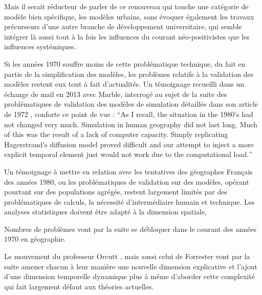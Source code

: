 Mais il serait réducteur de parler de ce renouveau qui touche une catégorie de modèle bien spécifique, les modèles urbains, sans évoquer également les travaux précurseurs d'une autre branche de développement universitaire, qui semble intégrer là aussi tout à la fois les influences du courant néo-positivistes que les influences systémiques. %

Si les années 1970 souffre moins de cette problématique technique, du fait en partie de la simplification des modèles, les problèmes relatifs à la validation des modèles restent eux tout à fait d'actualités. Un témoignage recueilli dans un échange de mail en 2013 avec Marble, interrogé au sujet de la suite des problématiques de validation des modèles de simulation détaillés dans son article de 1972 \autocite{Marble1972}, conforte ce point de vue : \foreignquote{english}{As I recall, the situation in the 1980's had not changed very much. Simulation in human geography did not last long. Much of this was the result of a lack of computer capacity. Simply replicating Hagerstrand's diffusion model proved difficult and our attempt to inject a more explicit temporal element just would not work due to the computational load.}

Un témoignage à mettre en relation avec les tentatives des géographes Français des années 1980, ou les problématiques de validation sur des modèles, opérant pourtant sur des populations agrégés, restent largement limités par des problématiques de calculs, la nécessité d'intermédiaire humain et technique. Les analyses statistiques doivent être adapté à la dimension spatiale, %





Nombres de problèmes vont par la suite se débloquer dans le courant des années 1970 en géographie.


Le mouvement du professeur Orcutt \autocite{Orcutt1957}, mais aussi celui de Forrester \autocite{Forrester1961, Forrester1969} vont par la suite amener chacun à leur manière une nouvelle dimension explicative et l'ajout d'une dimension temporelle dynamique plus à même d'aborder cette complexité qui fait largement défaut aux théories actuelles. \autocite[p295]{Batty1976}


